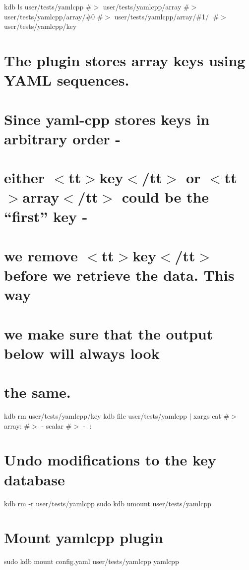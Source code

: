 kdb ls user/tests/yamlcpp \#$>$ user/tests/yamlcpp/array \#$>$ user/tests/yamlcpp/array/\#0 \#$>$ user/tests/yamlcpp/array/\#1/🔑 \#$>$ user/tests/yamlcpp/key\hypertarget{autotoc_md780_autotoc_md813}{}\section{The plugin stores array keys using Y\+A\+M\+L sequences.}\label{autotoc_md780_autotoc_md813}
\hypertarget{autotoc_md780_autotoc_md814}{}\section{Since yaml-\/cpp stores keys in arbitrary order -\/}\label{autotoc_md780_autotoc_md814}
\hypertarget{autotoc_md780_autotoc_md815}{}\section{either $<$tt$>$key$<$/tt$>$ or $<$tt$>$array$<$/tt$>$ could be the “first” key -\/}\label{autotoc_md780_autotoc_md815}
\hypertarget{autotoc_md780_autotoc_md816}{}\section{we remove $<$tt$>$key$<$/tt$>$ before we retrieve the data. This way}\label{autotoc_md780_autotoc_md816}
\hypertarget{autotoc_md780_autotoc_md817}{}\section{we make sure that the output below will always look}\label{autotoc_md780_autotoc_md817}
\hypertarget{autotoc_md780_autotoc_md818}{}\section{the same.}\label{autotoc_md780_autotoc_md818}
kdb rm user/tests/yamlcpp/key kdb file user/tests/yamlcpp $\vert$ xargs cat \#$>$ array\+: \#$>$ -\/ scalar \#$>$ -\/ 🔑\+: 🙈\hypertarget{autotoc_md780_autotoc_md819}{}\section{Undo modifications to the key database}\label{autotoc_md780_autotoc_md819}
kdb rm -\/r user/tests/yamlcpp sudo kdb umount user/tests/yamlcpp 
\begin{DoxyCode}{0}
\DoxyCodeLine{}
\end{DoxyCode}
 \hypertarget{autotoc_md780_autotoc_md820}{}\section{Mount yamlcpp plugin}\label{autotoc_md780_autotoc_md820}
sudo kdb mount config.\+yaml user/tests/yamlcpp yamlcpp

